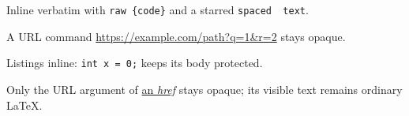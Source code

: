 Inline verbatim with \verb|raw {code}| and a starred \verb*|spaced  text|.

A URL command \url{https://example.com/path?q=1&r=2} stays opaque.

Listings inline: \lstinline{int x = 0;} keeps its body protected.

Only the URL argument of \href{https://example.test/a%20b}{an \emph{href}}
stays opaque; its visible text remains ordinary LaTeX.
